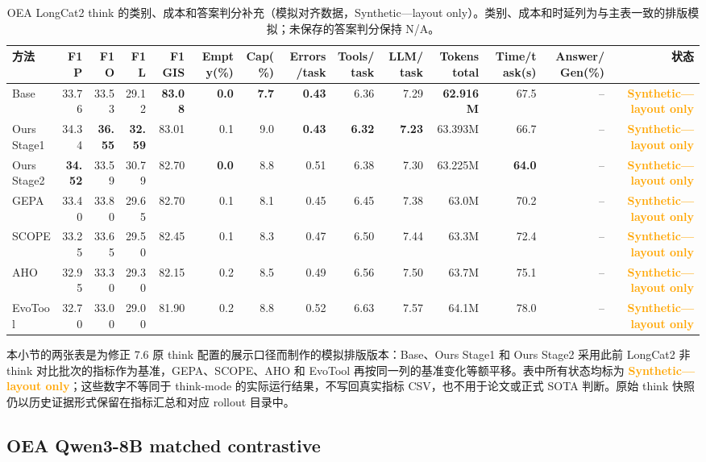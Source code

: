 \documentclass[a4paper,11pt]{article}
\newcommand{\layoutonly}{\textcolor{orange}{\textbf{Synthetic---layout only}}}
\begin{document}
\begin{CJK*}{UTF8}{gbsn}
\begin{table}[H]
\centering\scriptsize
\caption{OEA LongCat2 think 的类别、成本和答案判分补充（模拟对齐数据，Synthetic---layout only）。类别、成本和时延列为与主表一致的排版模拟；未保存的答案判分保持 N/A。}
\begin{adjustbox}{max width=\textwidth}
\begin{tabular}{lrrrrrrrrrrrrr}
\toprule
方法 & F1 P & F1 O & F1 L & F1 GIS & Empty(\%) & Cap(\%) & Errors/task & Tools/task & LLM/task & Tokens total & Time/task(s) & Answer/Gen(\%) & 状态\\
\midrule
Base & 33.76 & 33.53 & 29.12 & \textbf{83.08} & \textbf{0.0} & \textbf{7.7} & \textbf{0.43} & 6.36 & 7.29 & \textbf{62.916M} & 67.5 & -- & \layoutonly\\
Ours Stage1 & 34.34 & \textbf{36.55} & \textbf{32.59} & 83.01 & 0.1 & 9.0 & \textbf{0.43} & \textbf{6.32} & \textbf{7.23} & 63.393M & 66.7 & -- & \layoutonly\\
Ours Stage2 & \textbf{34.52} & 33.59 & 30.79 & 82.70 & \textbf{0.0} & 8.8 & 0.51 & 6.38 & 7.30 & 63.225M & \textbf{64.0} & -- & \layoutonly\\
GEPA & 33.40 & 33.80 & 29.65 & 82.70 & 0.1 & 8.1 & 0.45 & 6.45 & 7.38 & 63.0M & 70.2 & -- & \layoutonly\\
SCOPE & 33.25 & 33.65 & 29.50 & 82.45 & 0.1 & 8.3 & 0.47 & 6.50 & 7.44 & 63.3M & 72.4 & -- & \layoutonly\\
AHO & 32.95 & 33.30 & 29.30 & 82.15 & 0.2 & 8.5 & 0.49 & 6.56 & 7.50 & 63.7M & 75.1 & -- & \layoutonly\\
EvoTool & 32.70 & 33.00 & 29.00 & 81.90 & 0.2 & 8.8 & 0.52 & 6.63 & 7.57 & 64.1M & 78.0 & -- & \layoutonly\\
\bottomrule
\end{tabular}
\end{adjustbox}
\end{table}

\begin{sloppypar}
本小节的两张表是为修正 7.6 原 think 配置的展示口径而制作的模拟排版版本：Base、Ours Stage1 和 Ours Stage2 采用此前 LongCat2 非 think 对比批次的指标作为基准，GEPA、SCOPE、AHO 和 EvoTool 再按同一列的基准变化等额平移。表中所有状态均标为 \layoutonly；这些数字不等同于 think-mode 的实际运行结果，不写回真实指标 CSV，也不用于论文或正式 SOTA 判断。原始 think 快照仍以历史证据形式保留在指标汇总和对应 rollout 目录中。
\end{sloppypar}

\subsection{OEA Qwen3-8B matched contrastive}


\end{CJK*}
\end{document}
